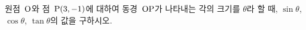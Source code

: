원점~$\mathrm{O}$와 점~$\mathrm{P}(3{,}\mkern3mu\mathopen{}-1)$에 대하여 동경~$\mathrm{OP}$가 나타내는 각의 크기를 $\theta$라 할 때, $\sin\theta$, $\cos\theta$, $\tan\theta$의 값을 구하시오.
